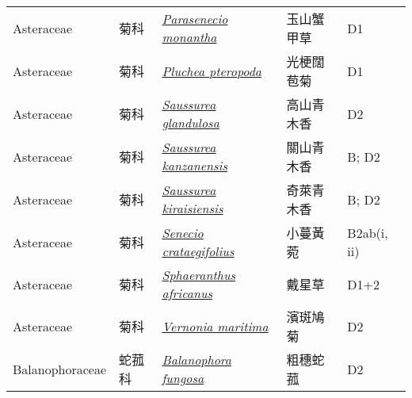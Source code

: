 {\begin{longtable}{L{2.5cm}L{2cm}L{5cm}L{2.5cm}L{3cm}}
    Asteraceae & 菊科 & \href{http://www.theplantlist.org/tpl1.1/search?q=Parasenecio+monantha}{\textit{Parasenecio monantha} } & 玉山蟹甲草 & D1    \\
    Asteraceae & 菊科 & \href{http://www.theplantlist.org/tpl1.1/search?q=Pluchea+pteropoda}{\textit{Pluchea pteropoda} } & 光梗闊苞菊 & D1    \\
    Asteraceae & 菊科 & \href{http://www.theplantlist.org/tpl1.1/search?q=Saussurea+glandulosa}{\textit{Saussurea glandulosa} } & 高山青木香 & D2    \\
    Asteraceae & 菊科 & \href{http://www.theplantlist.org/tpl1.1/search?q=Saussurea+kanzanensis}{\textit{Saussurea kanzanensis} } & 關山青木香 & B; D2    \\
    Asteraceae & 菊科 & \href{http://www.theplantlist.org/tpl1.1/search?q=Saussurea+kiraisiensis}{\textit{Saussurea kiraisiensis} } & 奇萊青木香 & B; D2    \\
    Asteraceae & 菊科 & \href{http://www.theplantlist.org/tpl1.1/search?q=Senecio+crataegifolius}{\textit{Senecio crataegifolius} } & 小蔓黃菀 & B2ab(i, ii)    \\
    Asteraceae & 菊科 & \href{http://www.theplantlist.org/tpl1.1/search?q=Sphaeranthus+africanus}{\textit{Sphaeranthus africanus} } & 戴星草 & D1+2    \\
    Asteraceae & 菊科 & \href{http://www.theplantlist.org/tpl1.1/search?q=Vernonia+maritima}{\textit{Vernonia maritima} } & 濱斑鳩菊 & D2    \\
    Balanophoraceae & 蛇菰科 & \href{http://www.theplantlist.org/tpl1.1/search?q=Balanophora+fungosa}{\textit{Balanophora fungosa} } & 粗穗蛇菰 & D2    \\

\end{longtable}}
